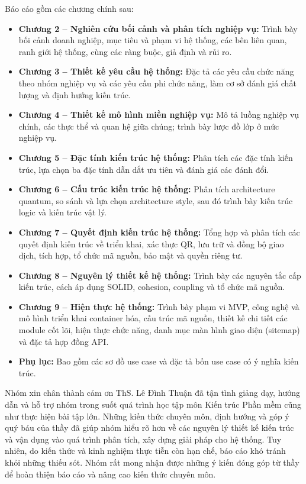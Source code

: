 Báo cáo gồm các chương chính sau:
\begin{itemize}
    \item \textbf{Chương 2 – Nghiên cứu bối cảnh và phân tích nghiệp vụ:} Trình bày bối cảnh doanh nghiệp, mục tiêu và phạm vi hệ thống, các bên liên quan, ranh giới hệ thống, cùng các ràng buộc, giả định và rủi ro.
    \item \textbf{Chương 3 – Thiết kế yêu cầu hệ thống:} Đặc tả các yêu cầu chức năng theo nhóm nghiệp vụ và các yêu cầu phi chức năng, làm cơ sở đánh giá chất lượng và định hướng kiến trúc.
    \item \textbf{Chương 4 – Thiết kế mô hình miền nghiệp vụ:} Mô tả luồng nghiệp vụ chính, các thực thể và quan hệ giữa chúng; trình bày lược đồ lớp ở mức nghiệp vụ.
    \item \textbf{Chương 5 – Đặc tính kiến trúc hệ thống:} Phân tích các đặc tính kiến trúc, lựa chọn ba đặc tính dẫn dắt ưu tiên và đánh giá các đánh đổi.
    \item \textbf{Chương 6 – Cấu trúc kiến trúc hệ thống:} Phân tích architecture quantum, so sánh và lựa chọn architecture style, sau đó trình bày kiến trúc logic và kiến trúc vật lý.
    \item \textbf{Chương 7 – Quyết định kiến trúc hệ thống:} Tổng hợp và phân tích các quyết định kiến trúc về triển khai, xác thực QR, lưu trữ và đồng bộ giao dịch, tích hợp, tổ chức mã nguồn, bảo mật và quyền riêng tư.
    \item \textbf{Chương 8 – Nguyên lý thiết kế hệ thống:} Trình bày các nguyên tắc cấp kiến trúc, cách áp dụng SOLID, cohesion, coupling và tổ chức mã nguồn.
    \item \textbf{Chương 9 – Hiện thực hệ thống:} Trình bày phạm vi MVP, công nghệ và mô hình triển khai container hóa, cấu trúc mã nguồn, thiết kế chi tiết các module cốt lõi, hiện thực chức năng, danh mục màn hình giao diện (sitemap) và đặc tả hợp đồng API.
    \item \textbf{Phụ lục:} Bao gồm các sơ đồ use case và đặc tả bốn use case có ý nghĩa kiến trúc.
\end{itemize}

Nhóm xin chân thành cảm ơn ThS. Lê Đình Thuận đã tận tình giảng dạy, hướng dẫn và hỗ trợ nhóm trong suốt quá trình học tập môn Kiến trúc Phần mềm cũng như thực hiện bài tập lớn. Những kiến thức chuyên môn, định hướng và góp ý quý báu của thầy đã giúp nhóm hiểu rõ hơn về các nguyên lý thiết kế kiến trúc và vận dụng vào quá trình phân tích, xây dựng giải pháp cho hệ thống. Tuy nhiên, do kiến thức và kinh nghiệm thực tiễn còn hạn chế, báo cáo khó tránh khỏi những thiếu sót. Nhóm rất mong nhận được những ý kiến đóng góp từ thầy để hoàn thiện báo cáo và nâng cao kiến thức chuyên môn.